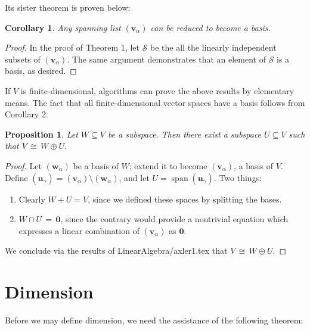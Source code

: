 \documentclass[11pt]{article}
\newtheorem{proposition}{Proposition}
\newtheorem{corollary}{Corollary}
\renewcommand{\vec}[1]{\mathbf{#1}}
\newcommand{\spn}{\operatorname{span}}
\begin{document}
Its sister theorem is proven below:

\begin{adjustwidth}{0.5cm}{}
  \begin{corollary}
    Any spanning list $(\vec{v}_{\alpha})$ can be reduced to become a basis.
  \end{corollary}
  \begin{proof}
    In the proof of Theorem 1, let $\mathcal{S}$ be the all the linearly independent subsets of $(\vec{v}_{\alpha})$. The same argument demonstrates that an element of $\mathcal{S}$ is a basis, as desired.
  \end{proof}
\end{adjustwidth}

If $V$ is finite-dimensional, algorithms can prove the above results by elementary means. The fact that all finite-dimensional vector spaces have a basis follows from Corollary 2.

\begin{adjustwidth}{0.5cm}{}
  \begin{proposition}
    Let $W \subseteq V$ be a subspace. Then there exist a subspace $U \subseteq V$ such that $V \, \cong \, W \oplus U$.
  \end{proposition}
  \begin{proof}
    Let $(\vec{w}_{\alpha})$ be a basis of $W$; extend it to become $(\vec{v}_{\alpha})$, a basis of $V$. Define $(\vec{u}_{\gamma}) = (\vec{v}_{\alpha}) \setminus (\vec{w}_{\alpha})$, and let $U = \spn(\vec{u}_{\gamma})$. Two things:
    \begin{enumerate}
      \item Clearly $W + U = V$, since we defined these spaces by splitting the bases.
      \item $W \cap U \, = \,  \vec{0}$, since the contrary would provide a nontrivial equation which expresses a linear combination of $(\vec{v}_{\alpha})$ as $\vec{0}$.
    \end{enumerate}
    We conclude via the results of LinearAlgebra/axler1.tex that $V \, \cong \, W \oplus U$.
  \end{proof} 
\end{adjustwidth}


\section{Dimension}

Before we may define dimension, we need the assistance of the following theorem:
\end{document}
